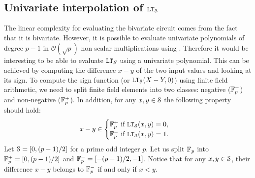 \subsection{Univariate interpolation of $\LT_\S$}
The linear complexity for evaluating the bivariate circuit comes from the fact that it is bivariate. 
However, it is possible to evaluate univariate polynomials of degree $p-1$ in $\mathcal{O}(\sqrt{p})$ non scalar multiplications using \cite{SIAM:PS73}. 
Therefore it would be interesting to be able to evaluate $\LT_S$ using a univariate polynomial. 
This can be achieved by computing the difference $x-y$ of the two input values and looking at its sign.
To compute the sign function (or $\LT_\S(X-Y,0)$) using finite field arithmetic, we need to split finite field elements into two classes:  negative ($\F_p^-$) and non-negative ($\F_p^+$).
In addition, for any $x, y \in \S$ the following property should hold:
\begin{align*}
  x - y \in 
  \begin{cases}
    \F_p^+ \text{ if } \LT_\S(x,y) = 0, \\
    \F_p^- \text{ if } \LT_\S(x,y) = 1.
  \end{cases}
\end{align*}   
Let $\S = [0, (p-1)/2]$ for a prime odd integer $p$.
Let us split $\F_p$ into $\F_p^+ = [0, (p-1)/2]$ and $\F_p^- = [-(p-1)/2, -1]$.
Notice that for any $x, y \in \S$, their difference $x - y$ belongs to $\F_p^-$ if and only if $x < y$.

